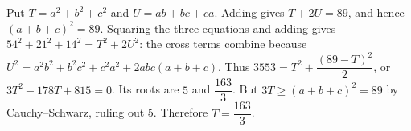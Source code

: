 Put $T=a^2+b^2+c^2$ and $U=ab+bc+ca$. Adding gives $T+2U=89$, and hence $(a+b+c)^2=89$. Squaring the three equations and adding gives $54^2+21^2+14^2=T^2+2U^2$: the cross terms combine because $U^2=a^2b^2+b^2c^2+c^2a^2+2abc(a+b+c)$. Thus $3553=T^2+\dfrac{(89-T)^2}{2}$, or $3T^2-178T+815=0$. Its roots are $5$ and $\dfrac{163}{3}$. But $3T\ge(a+b+c)^2=89$ by Cauchy--Schwarz, ruling out 5. Therefore $\boxed{T=\dfrac{163}{3}}$.
